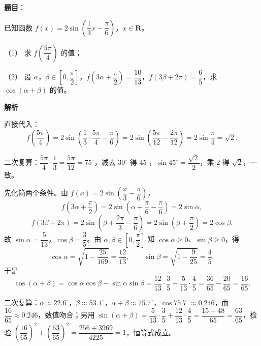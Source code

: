 \begin{answer}

\textbf{题目}：

已知函数 $f(x)=2\sin\left(\dfrac13x-\dfrac{\pi}{6}\right)$，$x\in\mathbf R$。

（1） 求 $f\left(\dfrac{5\pi}{4}\right)$ 的值；

（2） 设 $\alpha$，$\beta\in\left[0,\dfrac{\pi}{2}\right]$，$f\left(3\alpha+\dfrac{\pi}{2}\right)=\dfrac{10}{13}$，$f(3\beta+2\pi)=\dfrac65$，求 $\cos(\alpha+\beta)$ 的值。

\textbf{解析}

直接代入：
\nopagebreak[4]
\[f\left(\frac{5\pi}{4}\right)=2\sin\left(\frac13\cdot\frac{5\pi}{4}-\frac{\pi}{6}\right)=2\sin\left(\frac{5\pi}{12}-\frac{2\pi}{12}\right)=2\sin\frac{\pi}{4}=\sqrt2.\]

二次复算：$\dfrac{5\pi}{4}\cdot\dfrac13=\dfrac{5\pi}{12}=75^\circ$，减去 $30^\circ$ 得 $45^\circ$，$\sin45^\circ=\dfrac{\sqrt2}{2}$，乘 $2$ 得 $\sqrt2$，一致。

先化简两个条件。由 $f(x)=2\sin\left(\dfrac x3-\dfrac{\pi}{6}\right)$，
\nopagebreak[4]
\[f\left(3\alpha+\frac{\pi}{2}\right)=2\sin\left(\alpha+\frac{\pi}{6}-\frac{\pi}{6}\right)=2\sin\alpha,\]
\nopagebreak[4]
\[f(3\beta+2\pi)=2\sin\left(\beta+\frac{2\pi}{3}-\frac{\pi}{6}\right)=2\sin\left(\beta+\frac{\pi}{2}\right)=2\cos\beta.\]
故 $\sin\alpha=\dfrac{5}{13}$，$\cos\beta=\dfrac35$。由 $\alpha,\beta\in\left[0,\dfrac{\pi}{2}\right]$ 知 $\cos\alpha\geqslant0$、$\sin\beta\geqslant0$，得
\nopagebreak[4]
\[\cos\alpha=\sqrt{1-\frac{25}{169}}=\frac{12}{13},\qquad \sin\beta=\sqrt{1-\frac{9}{25}}=\frac45.\]
于是
\nopagebreak[4]
\[\cos(\alpha+\beta)=\cos\alpha\cos\beta-\sin\alpha\sin\beta=\frac{12}{13}\cdot\frac35-\frac{5}{13}\cdot\frac45=\frac{36}{65}-\frac{20}{65}=\frac{16}{65}.\]

二次复算：$\alpha\approx22.6^\circ$，$\beta\approx53.1^\circ$，$\alpha+\beta\approx75.7^\circ$，$\cos75.7^\circ\approx0.246$，而 $\dfrac{16}{65}\approx0.246$，数值吻合；另用 $\sin(\alpha+\beta)=\dfrac{5}{13}\cdot\dfrac35+\dfrac{12}{13}\cdot\dfrac45=\dfrac{15+48}{65}=\dfrac{63}{65}$，检验 $\left(\dfrac{16}{65}\right)^2+\left(\dfrac{63}{65}\right)^2=\dfrac{256+3969}{4225}=1$，恒等式成立。



\end{answer}
